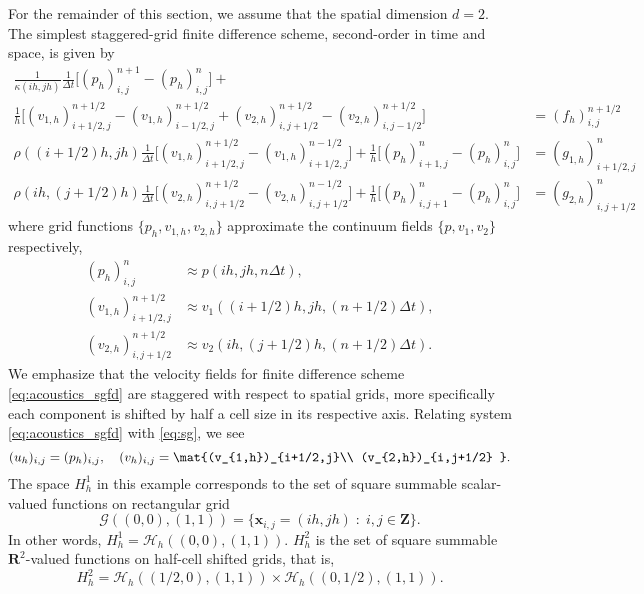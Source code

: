 For the remainder of this section, we assume that the spatial
dimension $d=2$. 
The simplest staggered-grid finite difference scheme, second-order in time and space, is given by
\begin{equation}\label{eq:acoustics_sgfd}
\begin{split}
	\frac{1}{\kappa(ih,jh)} \frac{1}{\Delta t} \Big[  (p_h)^{n+1}_{i,j} - (p_h)^{n}_{i,j} \Big] + \hspace{7cm}\\
	\frac{1}{h} \Big[ (v_{1,h})_{i+1/2,j}^{n+1/2} - (v_{1,h})_{i-1/2,j}^{n+1/2} + 
				(v_{2,h})_{i,j+1/2}^{n+1/2} - (v_{2,h})_{i,j-1/2}^{n+1/2} \Big] 
		&= (f_h)^{n+1/2}_{i,j}\\
	\rho((i+1/2)h,jh) \frac{1}{\Delta t} \Big[ (v_{1,h})^{n+1/2}_{i+1/2,j} - (v_{1,h})^{n-1/2}_{i+1/2,j} \Big] +
	\frac{1}{h} \Big[ (p_h)_{i+1,j}^{n} - (p_h)_{i,j}^{n} \Big] 
		&= (g_{1,h})_{i+1/2,j}^{n}\\
	\rho(ih,(j+1/2)h) \frac{1}{\Delta t} \Big[ (v_{2,h})^{n+1/2}_{i,j+1/2} - (v_{2,h})^{n-1/2}_{i,j+1/2} \Big] +
	\frac{1}{h} \Big[ (p_h)_{i,j+1}^{n} - (p_h)_{i,j}^{n} \Big] 
		&= (g_{2,h})_{i,j+1/2}^{n}
\end{split}
\end{equation}
where grid functions $\{p_h,v_{1,h},v_{2,h}\}$ approximate the continuum fields $\{p,v_1,v_2\}$ respectively, %
\begin{equation*}
\begin{split}
	(p_h)_{i,j}^{n} &\approx p(ih,jh,n\Delta t), \\
	(v_{1,h})_{i+1/2,j}^{n+1/2} &\approx v_1((i+1/2)h,jh,(n+1/2)\Delta t),\\
	(v_{2,h})_{i,j+1/2}^{n+1/2} &\approx v_2(ih,(j+1/2)h,(n+1/2)\Delta t).
\end{split}
\end{equation*}
We emphasize that the velocity fields for finite difference scheme \ref{eq:acoustics_sgfd} are staggered with respect to spatial grids, more specifically each component is shifted by half a cell size in its respective axis.
Relating system \ref{eq:acoustics_sgfd} with \ref{eq:sg}, we see
\[
	(u_h)_{i,j} = (p_h)_{i,j}, \quad 
	(v_h)_{i,j} = \mat{(v_{1,h})_{i+1/2,j}\\ 
				  (v_{2,h})_{i,j+1/2} }.
\]
The space $H_h^1$ in this example corresponds to the set of square summable 
scalar-valued functions on rectangular grid
\[
	\mathcal G((0,0),(1,1)) = \{ \mathbf x_{i,j} = (ih,jh) \; : \; i,j\in\mathbf Z \}.
\]
In other words, $H_h^1 = \mathcal H_h((0,0),(1,1))$.
$H_h^2$ is the set of square summable $\mathbf R^2$-valued functions on half-cell shifted grids, that is, 
\[
	H_h^2 = \mathcal H_h((1/2,0),(1,1)) \times \mathcal H_h((0,1/2),(1,1)).
\]  


